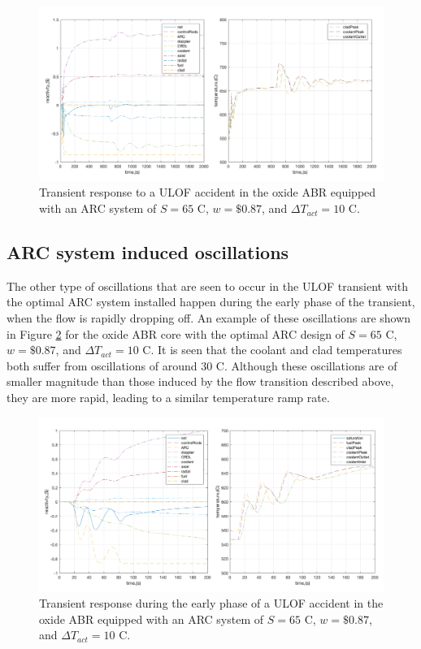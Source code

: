 \documentclass[11pt, oneside]{article}   	%
\begin{document}
\begin{figure}[h!]
\includegraphics[width=18cm]{ULOF_65_087_10}
\centering
\caption{Transient response to a ULOF accident in the oxide ABR equipped with an ARC system of $S=65$ C, $w=\$0.87$, and $\Delta T_{act} = 10$ C.}
\label{fig:ULOF_65_0.87_10}
\end{figure}

\subsection{ARC system induced oscillations} \label{sec:increasingS}

The other type of oscillations that are seen to occur in the ULOF transient with the optimal ARC system installed happen during the early phase of the transient, when the flow is rapidly dropping off.
An example of these oscillations are shown in Figure \ref{fig:ULOF_65_0.87_10_early} for the oxide ABR core with the optimal ARC design of $S=65$ C, $w=\$0.87$, and $\Delta T_{act} = 10$ C.
It is seen that the coolant and clad temperatures both suffer from oscillations of around 30 C.
Although these oscillations are of smaller magnitude than those induced by the flow transition described above, they are more rapid, leading to a similar temperature ramp rate. 

\begin{figure}[h!]
\includegraphics[width=18cm]{ULOF_65_087_10_early}
\centering
\caption{Transient response during the early phase of a ULOF accident in the oxide ABR equipped with an ARC system of $S=65$ C, $w=\$0.87$, and $\Delta T_{act} = 10$ C.}
\label{fig:ULOF_65_0.87_10_early}
\end{figure}
\end{document}
